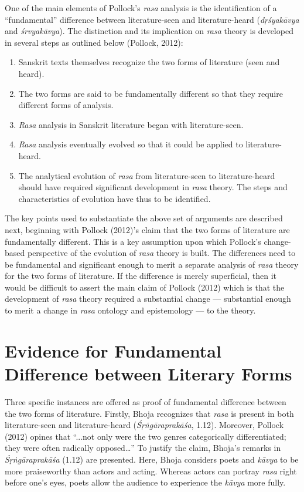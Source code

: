 One of the main elements of Pollock’s \textsl{rasa }analysis is the identification of a “fundamental” difference between literature-seen and literature-heard (\textsl{dṛśyakāvya} and \textsl{śrvyakāvya}). The distinction and its implication on \textsl{rasa} theory is developed in several steps as outlined below (Pollock, 2012):
\begin{enumerate}
\itemsep=1pt
\item Sanskrit texts themselves recognize the two forms of literature (seen and heard). 
\item The two forms are said to be fundamentally different so that they require different forms of analysis.
\item \textsl{Rasa }analysis in Sanskrit literature began with literature-seen.
\item \textsl{Rasa }analysis eventually evolved so that it could be applied to literature-heard.
\item The analytical evolution of \textsl{rasa} from literature-seen to literature-heard should have required significant development in \textsl{rasa} theory. The steps and characteristics of evolution have thus to be identified.
\end{enumerate}

The key points used to substantiate the above set of arguments are described next, beginning with Pollock (2012)’s claim that the two forms of literature are fundamentally different. This is a key assumption upon which Pollock’s change-based perspective of the evolution of \textsl{rasa }theory is built. The differences need to be fundamental and significant enough to merit a separate analysis of \textsl{rasa} theory for the two forms of literature. If the difference is merely superficial, then it would be difficult to assert the main claim of Pollock (2012) which is that the development of \textsl{rasa} theory required a substantial change --- substantial enough to merit a change in \textsl{rasa }ontology and epistemology --- to the theory. 

\section*{Evidence for Fundamental Difference between Literary Forms}

Three specific instances are offered as proof of fundamental difference between the two forms of literature. Firstly, Bhoja recognizes that \textsl{rasa} is present in both literature-seen and literature-heard (\textsl{Śṛṅgāraprakāśa}, 1.12). Moreover, Pollock (2012) opines that “...not only were the two genres categorically differentiated; they were often radically opposed…” To justify the claim, Bhoja’s remarks in \textsl{Śṛṅgāraprakāśa }(1.12) are presented. Here, Bhoja considers poets and \textsl{kāvya }to be more praiseworthy than actors and acting. Whereas actors can portray \textsl{rasa} right before one’s eyes, poets allow the audience to experience the \textsl{kāvya }more fully. 

